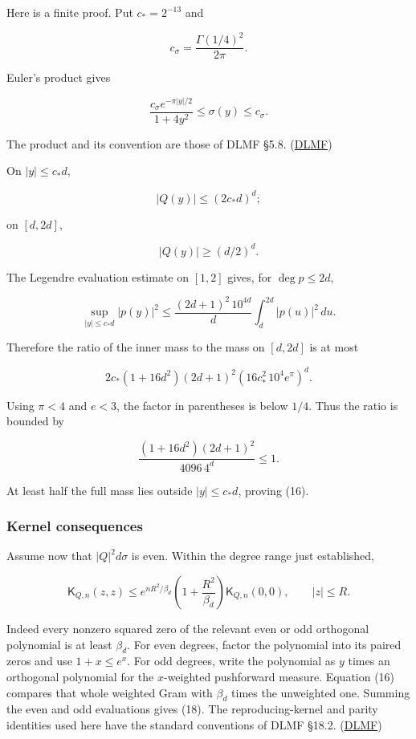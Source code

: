 \documentclass[11pt]{article}
\begin{document}
Here is a finite proof. Put \(c_*=2^{-13}\) and

\[
c_\sigma=\frac{\Gamma(1/4)^2}{2\pi}.
\]

Euler's product gives

\[
\frac{c_\sigma e^{-\pi|y|/2}}{1+4y^2}
\le\sigma(y)\le c_\sigma.
\tag{17}
\]

The product and its convention are those of DLMF §5.8. (\href{https://dlmf.nist.gov/5.8}{DLMF})

On \(|y|\le c_*d\),

\[
|Q(y)|\le(2c_*d)^d;
\]

on \([d,2d]\),

\[
|Q(y)|\ge(d/2)^d.
\]

The Legendre evaluation estimate on \([1,2]\) gives, for \(\deg p\le2d\),

\[
\sup_{|y|\le c_*d}|p(y)|^2
\le
\frac{(2d+1)^2\,10^{4d}}{d}
\int_d^{2d}|p(u)|^2\,du.
\]

Therefore the ratio of the inner mass to the mass on \([d,2d]\) is at most

\[
2c_*(1+16d^2)(2d+1)^2
\left(16c_*^2\,10^4e^\pi\right)^d.
\]

Using \(\pi<4\) and \(e<3\), the factor in parentheses is below \(1/4\). Thus the ratio is bounded by

\[
\frac{(1+16d^2)(2d+1)^2}{4096\,4^d}\le1.
\]

At least half the full mass lies outside \(|y|\le c_*d\), proving (16).

\subsubsection{Kernel consequences}\label{kernel-consequences}

Assume now that \(|Q|^2d\sigma\) is even. Within the degree range just established,

\[
\boxed{
\mathsf K_{Q,n}(z,z)
\le
e^{nR^2/\beta_d}
\left(1+\frac{R^2}{\beta_d}\right)
\mathsf K_{Q,n}(0,0),
\qquad |z|\le R.
}
\tag{18}
\]

Indeed every nonzero squared zero of the relevant even or odd orthogonal polynomial is at least \(\beta_d\). For even degrees, factor the polynomial into its paired zeros and use \(1+x\le e^x\). For odd degrees, write the polynomial as \(y\) times an orthogonal polynomial for the \(x\)-weighted pushforward measure. Equation (16) compares that whole weighted Gram with \(\beta_d\) times the unweighted one. Summing the even and odd evaluations gives (18). The reproducing-kernel and parity identities used here have the standard conventions of DLMF §18.2. (\href{https://dlmf.nist.gov/18.2}{DLMF})
\end{document}
